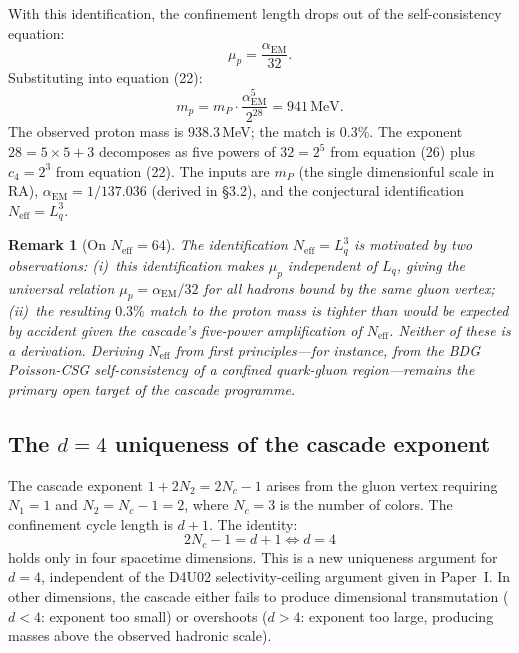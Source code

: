 \documentclass[11pt]{article}
\newtheorem{remark}{Remark}
\begin{document}
With this identification, the confinement length drops out of the self-consistency equation:
\begin{equation}
\mu_p = \frac{\alpha_{\mathrm{EM}}}{32}.
\end{equation}
Substituting into equation (22):
\begin{equation}
m_p = m_P\cdot\frac{\alpha_{\mathrm{EM}}^5}{2^{28}} = 941\,\mathrm{MeV}.
\end{equation}
The observed proton mass is $938.3$\,MeV; the match is $0.3\%$. The exponent $28=5\times 5+3$ decomposes as five powers of $32=2^5$ from equation (26) plus $c_4=2^3$ from equation (22). The inputs are $m_P$ (the single dimensionful scale in RA), $\alpha_{\mathrm{EM}}=1/137.036$ (derived in \S3.2), and the conjectural identification $N_{\mathrm{eff}}=L_q^3$.

\begin{remark}[On $N_{\mathrm{eff}}=64$]
The identification $N_{\mathrm{eff}}=L_q^3$ is motivated by two observations: (i)~this identification makes $\mu_p$ independent of $L_q$, giving the universal relation $\mu_p=\alpha_{\mathrm{EM}}/32$ for all hadrons bound by the same gluon vertex; (ii)~the resulting $0.3\%$ match to the proton mass is tighter than would be expected by accident given the cascade's five-power amplification of $N_{\mathrm{eff}}$. Neither of these is a derivation. Deriving $N_{\mathrm{eff}}$ from first principles---for instance, from the BDG Poisson-CSG self-consistency of a confined quark-gluon region---remains the primary open target of the cascade programme.
\end{remark}

\subsection{The $d=4$ uniqueness of the cascade exponent}

The cascade exponent $1+2N_2=2N_c-1$ arises from the gluon vertex requiring $N_1=1$ and $N_2=N_c-1=2$, where $N_c=3$ is the number of colors. The confinement cycle length is $d+1$. The identity:
\begin{equation}
2N_c-1 = d+1 \iff d=4
\end{equation}
holds only in four spacetime dimensions. This is a new uniqueness argument for $d=4$, independent of the D4U02 selectivity-ceiling argument given in Paper~I. In other dimensions, the cascade either fails to produce dimensional transmutation ($d<4$: exponent too small) or overshoots ($d>4$: exponent too large, producing masses above the observed hadronic scale).
\end{document}
